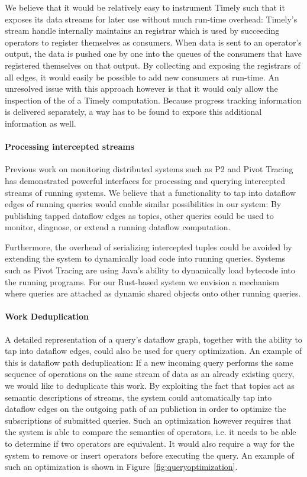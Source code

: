 We believe that it would be relatively easy to instrument Timely such
that it exposes its data streams for later use without much run-time
overhead: Timely's stream handle internally maintains an registrar which
is used by succeeding operators to register themselves as consumers.
When data is sent to an operator's output, the data is pushed one by one into the
queues of the consumers that have registered themselves on that output. By collecting and exposing
the registrars of all edges, it would easily be possible to add new consumers
at run-time. An unresolved issue with this approach however is that it would only allow
the inspection of the  of a Timely computation. Because
progress tracking information is delivered separately, a way has to be found to
expose this additional information as well.

\paragraph{Processing intercepted streams}

Previous work on monitoring distributed systems such as P2 \cite{p2} and
Pivot Tracing \cite{pivot} has demonstrated powerful interfaces for
processing and querying intercepted streams of running systems.
We believe that a functionality to tap into dataflow edges of running queries would
enable similar possibilities in our system: By publishing tapped
dataflow edges as topics, other queries could be used to monitor, diagnose, or
extend a running dataflow computation.

Furthermore, the overhead of serializing intercepted tuples could be avoided
by extending the system to dynamically load code into running queries. Systems
such as Pivot Tracing are using Java's ability to dynamically load
bytecode into the running programs. For our Rust-based system we envision a
mechanism where queries are attached as dynamic shared objects onto other
running queries.

\paragraph{Work Deduplication}

A detailed representation of a query's dataflow graph, together with the ability
to tap into dataflow edges, could also be used for query optimization. An example
of this is dataflow path deduplication: If a new incoming query performs the same
sequence of operations on the same stream of data as an already existing
query, we would like to deduplicate this work. By exploiting the fact that
topics act as semantic descriptions of streams, the system could automatically
tap into dataflow edges on the outgoing path of an publiction in order to
optimize the subscriptions of submitted queries. Such an optimization however
requires that the system is able to compare the semantics of operators,
i.e. it needs to be able to determine if two operators are equivalent. It
would also require a way for the system to remove or insert operators before
executing the query.
An example of such an optimization is shown in Figure~\ref{fig:queryoptimization}.

